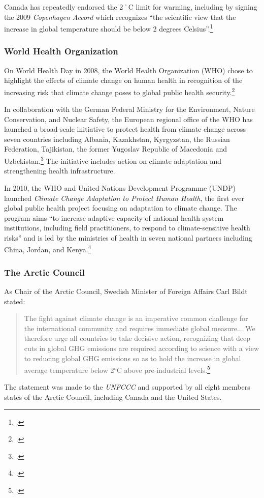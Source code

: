 	

Canada has repeatedly endorsed the 2˚C limit for warming, including by signing the 2009 \emph{Copenhagen Accord} which recognizes ``the scientific view that the increase in global temperature should be below 2 degrees Celsius''.\footcite[][Article 1]{CopenhagenAccord}



	\subsubsection{World Health Organization}
	
	

On World Health Day in 2008, the World Health Organization (WHO) chose to highlight the effects of climate change on human health in recognition of the increasing risk that climate change poses to global public health security.\footcite[][]{WHOHealthDay2008}



In collaboration with the German Federal Ministry for the Environment, Nature Conservation, and Nuclear Safety, the European regional office of the WHO has launched a broad-scale initiative to protect health from climate change across seven countries including Albania, Kazakhstan, Kyrgyzstan, the Russian Federation, Tajikistan, the former Yugoslav Republic of Macedonia and Uzbekistan.\footcite[][]{WHOSevenCountry}
The initiative includes action on climate adaptation and strengthening health infrastructure.



In 2010, the WHO and United Nations Development Programme (UNDP) launched \emph{Climate Change Adaptation to Protect Human Health}, the first ever global public health project focusing on adaptation to climate change. 
The program aims ``to increase adaptive capacity of national health system institutions, including field practitioners, to respond to climate-sensitive health risks'' and is led by the ministries of health in seven national partners including China, Jordan, and Kenya.\footcite[][]{WHOProtectHumanHealth}



	\subsubsection{The Arctic Council}
	


As Chair of the Arctic Council, Swedish Minister of Foreign Affairs Carl Bildt stated:
\begin{quote}
The fight against climate change is an imperative common challenge for the international community and requires immediate global measure... We therefore urge all countries to take decisive action, recognizing that deep cuts in global GHG emissions are required according to science with a view to reducing global GHG emissions so as to hold the increase in global average temperature below 2°C above pre-industrial levels.\footcite[][]{BildtArcticCouncil}
\end{quote}
The statement was made to the \emph{UNFCCC} and supported by all eight members states of the Arctic Council, including Canada and the United States.




